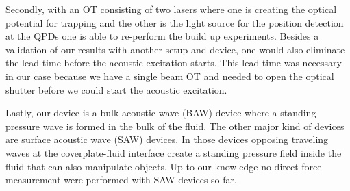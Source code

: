 Secondly, with an OT consisting of two lasers where one is creating the optical 
potential for trapping and the other is the light source for the position 
detection at the QPDs one is able to re-perform the build up experiments. 
Besides a validation of our results with another setup and device, one would 
also eliminate the lead time before the acoustic excitation starts. This lead 
time was necessary in our case because we have a single beam OT and needed to 
open the optical shutter before we could start the acoustic excitation.

Lastly, our device is a bulk acoustic wave (BAW) device where a standing 
pressure wave is formed in the bulk of the fluid. The other major kind of 
devices are surface acoustic wave (SAW) devices. In those devices opposing 
traveling waves at the coverplate-fluid interface create a standing pressure 
field inside the fluid that can also manipulate objects. Up to our knowledge no 
direct force measurement were performed with SAW devices so far.
